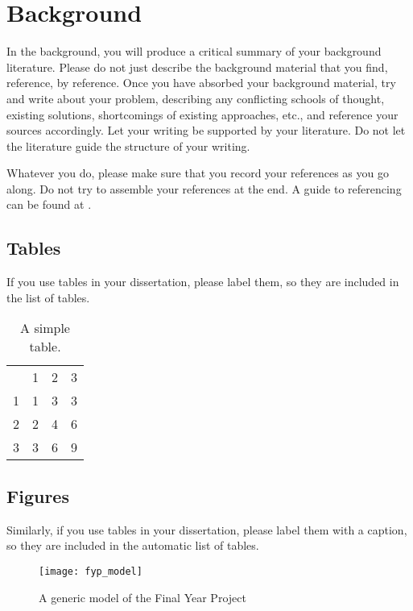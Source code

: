 %
%

\chapter{Background}

In the background, you will produce a critical summary of your background
literature.  Please do not just describe the background material that you find,
reference, by reference.  Once you have absorbed your background material, try
and write about your problem, describing any conflicting schools of thought,
existing solutions, shortcomings of existing approaches, etc., and reference
your sources accordingly.  Let your writing be supported by your literature.
Do not let the literature guide the structure of your writing.

Whatever you do, please make sure that you record your references as you go
along. Do not try to assemble your references at the end. A guide to
referencing can be found at \parencite{brunel2013ref}.

\section{Tables}

If you use tables in your dissertation, please label them, so they are included
in the list of tables.


\begin{table}[H]
  \begin{tabular}{l | l | l | l }
    & 1 & 2 & 3 \\
    1 & 1 & 3 & 3 \\
    2 & 2 & 4 & 6 \\
    3 & 3 & 6 & 9 \\
  \end{tabular}
  \caption{A simple table.\label{tab:simple_table}}
\end{table}

\section{Figures}

Similarly, if you use tables in your dissertation, please label them with a
caption, so they are included in the automatic list of tables.

\begin{figure}[H]
  \centering
  \texttt{[image: fyp\_model]}
  \caption{A generic model of the Final Year Project\label{fig:fyp_model}}
\end{figure}
